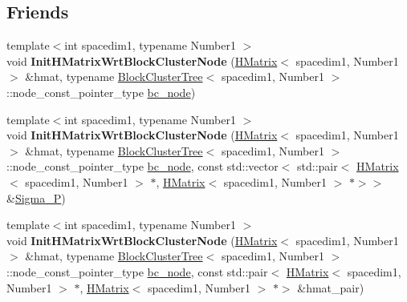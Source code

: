 \subsection*{Friends}
\begin{DoxyCompactItemize}
\item 
\mbox{\label{classHMatrix_aa949159fde08b9c728ce2cd4c6b99de6}} 
{\footnotesize template$<$int spacedim1, typename Number1 $>$ }\\void {\bfseries Init\+H\+Matrix\+Wrt\+Block\+Cluster\+Node} (\hyperlink{classHMatrix}{H\+Matrix}$<$ spacedim1, Number1 $>$ \&hmat, typename \hyperlink{classBlockClusterTree}{Block\+Cluster\+Tree}$<$ spacedim1, Number1 $>$\+::node\+\_\+const\+\_\+pointer\+\_\+type \hyperlink{classHMatrix_a4a304494c970b5b267be1d8459d51586}{bc\+\_\+node})
\item 
\mbox{\label{classHMatrix_ab5b4274a06c4ec21a0c1ee4ed870d3a3}} 
{\footnotesize template$<$int spacedim1, typename Number1 $>$ }\\void {\bfseries Init\+H\+Matrix\+Wrt\+Block\+Cluster\+Node} (\hyperlink{classHMatrix}{H\+Matrix}$<$ spacedim1, Number1 $>$ \&hmat, typename \hyperlink{classBlockClusterTree}{Block\+Cluster\+Tree}$<$ spacedim1, Number1 $>$\+::node\+\_\+const\+\_\+pointer\+\_\+type \hyperlink{classHMatrix_a4a304494c970b5b267be1d8459d51586}{bc\+\_\+node}, const std\+::vector$<$ std\+::pair$<$ \hyperlink{classHMatrix}{H\+Matrix}$<$ spacedim1, Number1 $>$ $\ast$, \hyperlink{classHMatrix}{H\+Matrix}$<$ spacedim1, Number1 $>$ $\ast$$>$$>$ \&\hyperlink{classHMatrix_a3d96d0252ef8c873ae06cf87874acaf3}{Sigma\+\_\+P})
\item 
\mbox{\label{classHMatrix_abe123e0f8daa856e4b85e00829398b79}} 
{\footnotesize template$<$int spacedim1, typename Number1 $>$ }\\void {\bfseries Init\+H\+Matrix\+Wrt\+Block\+Cluster\+Node} (\hyperlink{classHMatrix}{H\+Matrix}$<$ spacedim1, Number1 $>$ \&hmat, typename \hyperlink{classBlockClusterTree}{Block\+Cluster\+Tree}$<$ spacedim1, Number1 $>$\+::node\+\_\+const\+\_\+pointer\+\_\+type \hyperlink{classHMatrix_a4a304494c970b5b267be1d8459d51586}{bc\+\_\+node}, const std\+::pair$<$ \hyperlink{classHMatrix}{H\+Matrix}$<$ spacedim1, Number1 $>$ $\ast$, \hyperlink{classHMatrix}{H\+Matrix}$<$ spacedim1, Number1 $>$ $\ast$$>$ \&hmat\+\_\+pair)
\item 
\mbox{\label{classHMatrix_a69a9e7eae8c4fbab8c426552399d072a}} 
$$
\end{DoxyCompactItemize}
